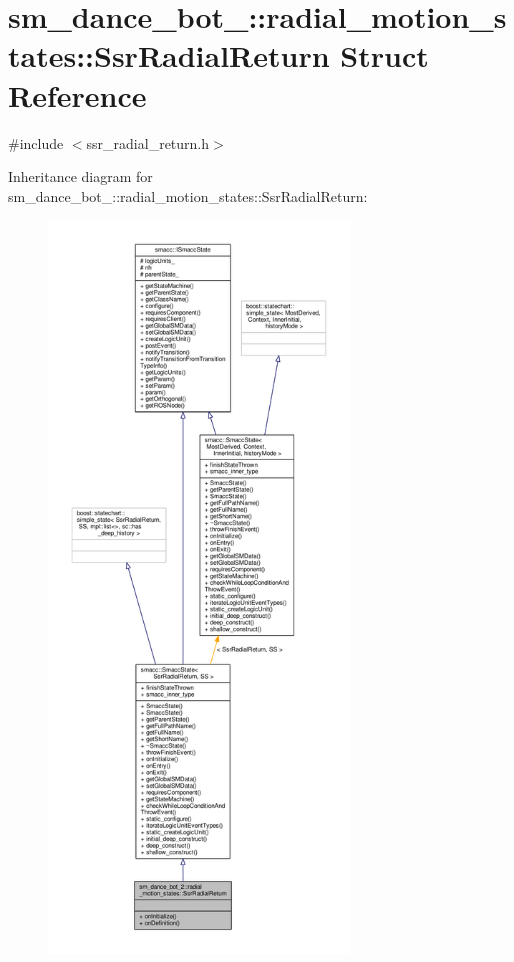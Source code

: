 \hypertarget{structsm__dance__bot__2_1_1radial__motion__states_1_1SsrRadialReturn}{}\section{sm\+\_\+dance\+\_\+bot\+\_\+:\+:radial\+\_\+motion\+\_\+states\+:\+:Ssr\+Radial\+Return Struct Reference}
\label{structsm__dance__bot__2_1_1radial__motion__states_1_1SsrRadialReturn}


{\ttfamily \#include $<$ssr\+\_\+radial\+\_\+return.\+h$>$}



Inheritance diagram for sm\+\_\+dance\+\_\+bot\+\_\+:\+:radial\+\_\+motion\+\_\+states\+:\+:Ssr\+Radial\+Return\+:\nopagebreak
\begin{figure}[H]
\begin{center}
\leavevmode
\includegraphics[height=550pt]{structsm__dance__bot__2_1_1radial__motion__states_1_1SsrRadialReturn__inherit__graph}
\end{center}
\end{figure}


